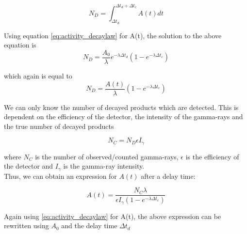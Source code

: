 \documentclass[a4paper,11pt,twoside]{book}
\begin{document}
\begin{equation}
    N_D = \int_{\Delta t_d}^{\Delta t_d + \Delta t_c} A(t) dt
\end{equation}

Using equation \ref{eq:activity_decaylaw} for A(t), the solution to the above equation is 
\begin{equation} \label{eq:numb_of_decayed}
    N_D= \frac{A_0}{\lambda}e^{-\lambda \Delta t_d}(1-e^{-\lambda \Delta t_c})
\end{equation}

which again is equal to
\begin{equation}
    N_D = \frac{A(t)}{\lambda} (1-e^{-\lambda \Delta t_c})
\end{equation}

We can only know the number of decayed products which are detected. This is dependent on the efficiency of the detector, the intensity of the gamma-rays and the true number of decayed products

\begin{equation}\label{eq:Ngamma}
    N_C  = N_D \epsilon I_\gamma
\end{equation}

where $N_C$ is the number of observed/counted gamma-rays, $\epsilon$ is the efficiency of the detector and $I_\gamma$ is the gamma-ray intensity.\\ 

\noindent
Thus, we can obtain an expression for $A(t)$ after a delay time: 

\begin{equation} \label{eq:Final_Expression_A}
    A(t) = \frac{N_C \lambda}{\epsilon I_\gamma (1-e^{-\lambda \Delta t_c})}
\end{equation}

\noindent 
Again using \ref{eq:activity_decaylaw} for A(t), the above expression can be rewritten using $A_0$ and the delay time $\Delta t_d$
\end{document}

